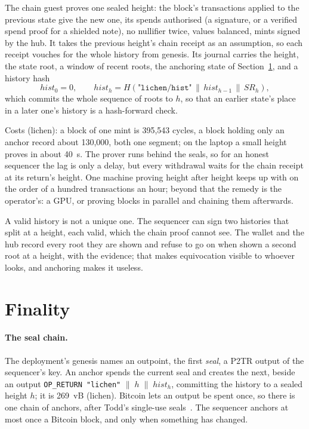 \documentclass[11pt]{article}
\newcommand{\tx}[1]{\texttt{#1}}
\begin{document}
The chain guest proves one sealed height: the block's transactions
applied to the previous state give the new one, its spends authorised (a
signature, or a verified spend proof for a shielded note), no nullifier
twice, values balanced, mints signed by the hub. It takes the previous
height's chain receipt as an assumption, so each receipt vouches for the
whole history from genesis. Its journal carries the height, the state
root, a window of recent roots, the anchoring state of
Section~\ref{sec:finality}, and a history hash
\[
  \mathit{hist}_0 = 0, \qquad
  \mathit{hist}_h = H(\texttt{"lichen/hist"} \,\|\, \mathit{hist}_{h-1} \,\|\, \mathit{SR}_h),
\]
which commits the whole sequence of roots to $h$, so that an earlier
state's place in a later one's history is a hash-forward check.

Costs (lichen): a block of one mint is 395,543 cycles, a block holding
only an anchor record about 130,000, both one segment; on the laptop a
small height proves in about 40~s. The prover runs behind the seals, so
for an honest sequencer the lag is only a delay, but every withdrawal
waits for the chain receipt at its return's height. One machine proving
height after height keeps up with on the order of a hundred
transactions an hour; beyond that the remedy is the operator's: a GPU,
or proving blocks in parallel and chaining them afterwards.

A valid history is not a unique one. The sequencer can sign two
histories that split at a height, each valid, which the chain proof
cannot see. The wallet and the hub record every root they are shown and
refuse to go on when shown a second root at a height, with the evidence;
that makes equivocation visible to whoever looks, and anchoring makes it
useless.

\section{Finality}
\label{sec:finality}

\paragraph{The seal chain.} The deployment's genesis names an outpoint,
the first \emph{seal}, a P2TR output of the sequencer's key. An anchor
spends the current seal and creates the next, beside an output
\tx{OP\_RETURN "lichen"} $\| \; h \;\|\; \mathit{hist}_h$, committing the
history to a sealed height $h$; it is 269~vB (lichen). Bitcoin lets an
output be spent once, so there is one chain of anchors, after Todd's
single-use seals~\cite{toddseals}. The sequencer anchors at most once a
Bitcoin block, and only when something has changed.
\end{document}
